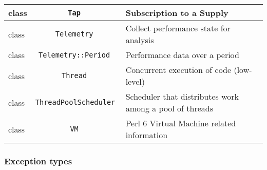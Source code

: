 \documentclass[17pt,english]{extarticle}
\providecommand{\tabularnewline}{\\}
\begin{document}
\begin{longtable}{|>{\centering}p{}|c|>{\centering}p{}}
\hline 
\hline 
class  &
\texttt{Tap } &
Subscription to a Supply\tabularnewline
\hline 
\hline 
class  &
\texttt{Telemetry } &
Collect performance state for analysis\tabularnewline
\hline 
\hline 
class  &
\texttt{Telemetry::Period } &
Performance data over a period\tabularnewline
\hline 
\hline 
class  &
\texttt{Thread } &
Concurrent execution of code (low-level)\tabularnewline
\hline 
\hline 
class  &
\texttt{ThreadPoolScheduler } &
Scheduler that distributes work among a pool of threads\tabularnewline
\hline 
\hline 
class  &
\texttt{VM } &
Perl 6 Virtual Machine related information\tabularnewline
\hline 
\end{longtable}


\subsubsection*{Exception types}
\end{document}
